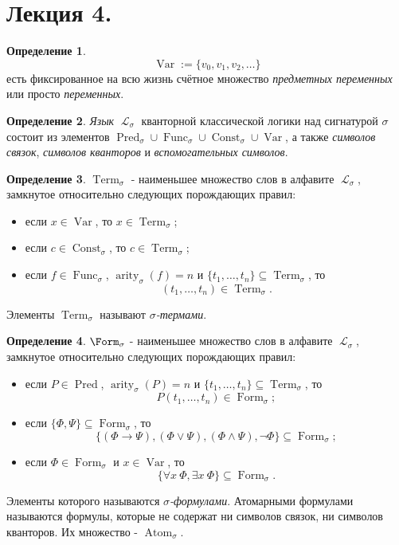 \documentclass[a4paper,100pt]{article}
\theoremstyle{indented}
\theoremstyle{definition}
\newtheorem{defn}{Определение}
\theoremstyle{remark}
\DeclareMathOperator{\ra}{\rightarrow}
\DeclareMathOperator{\LL}{\mathscr{L}}
\DeclareMathOperator{\form}{Form}
\DeclareMathOperator{\Pred}{Pred}
\DeclareMathOperator{\Func}{Func}
\DeclareMathOperator{\Const}{Const}
\DeclareMathOperator{\arity}{arity}
\DeclareMathOperator{\Var}{Var}
\DeclareMathOperator{\Term}{Term}
\DeclareMathOperator{\Atom}{Atom}
\begin{document}
\section{Лекция 4.} 

\begin{defn}
  \[
    \Var:=\{v_0, v_1, v_2, \ldots \}
  \]
  есть фиксированное на всю жизнь счётное множество \textit{предметных переменных} или просто \textit{переменных}.
\end{defn}

\begin{defn}
  \textit{Язык} $\LL_\sigma$ кванторной классической логики над сигнатурой $\sigma$ состоит из элементов $\Pred_\sigma \cup \Func_\sigma \cup \Const_\sigma \cup \Var$, а также \textit{символов связок}, \textit{символов кванторов} и \textit{вспомогательных символов}.
\end{defn}

\begin{defn}
  $\Term_\sigma$ - наименьшее множество слов в алфавите $\LL_\sigma$, замкнутое относительно следующих порождающих правил: 
  
  \begin{itemize}
    \item если $x\in \Var$, то $x\in \Term_\sigma$; 
    \item если $c\in \Const_\sigma$, то $c\in \Term_\sigma$; 
    \item если $f\in \Func_\sigma$, $\arity_\sigma (f)=n$ и $\{t_1, \ldots, t_n\}\subseteq \Term_\sigma$, то 
    \[
      (t_1, \ldots, t_n)\in \Term_\sigma.
    \]
  \end{itemize}

  Элементы $\Term_\sigma$ называют \textit{$\sigma$-термами}.
\end{defn}

\begin{defn}
  $\Form_\sigma$ - наименьшее множество слов в алфавите $\LL_\sigma$, замкнутое относительно следующих порождающих правил:

  \begin{itemize}
    \item если $P\in \Pred$, $\arity_\sigma(P)=n$ и $\{t_1, \ldots, t_n\}\subseteq \Term_\sigma$, то 
    \[
      P(t_1, \ldots, t_n)\in \form_\sigma; 
    \]
    \item если $\{\Phi, \Psi\}\subseteq \form_\sigma$, то 
    \[
      \{(\Phi\ra \Psi), (\Phi\vee \Psi), (\Phi\wedge \Psi), \neg \Phi \} \subseteq \form_\sigma; 
    \]
    \item если $\Phi \in \form_\sigma$ и $x \in \Var$, то
    \[
      \{\forall x \: \Phi, \exists x \: \Phi\} \subseteq \form_\sigma.
    \]
  \end{itemize}

  Элементы которого называются \textit{$\sigma$-формулами}. Атомарными формулами называются формулы, которые не содержат ни символов связок, ни символов кванторов. Их множество - $\Atom_\sigma$. 
\end{defn}
\end{document}
